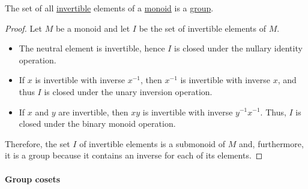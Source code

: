 \begin{proposition}\label{thm:invertible_submonoid_is_group}
  The set of all \hyperref[def:monoid_inverse]{invertible} elements of a \hyperref[def:monoid]{monoid} is a \hyperref[def:group]{group}.
\end{proposition}
\begin{proof}
  Let \( M \) be a monoid and let \( I \) be the set of invertible elements of \( M \).

  \begin{itemize}
    \item The neutral element is invertible, hence \( I \) is closed under the nullary identity operation.
    \item If \( x \) is invertible with inverse \( x^{-1} \), then \( x^{-1} \) is invertible with inverse \( x \), and thus \( I \) is closed under the unary inversion operation.
    \item If \( x \) and \( y \) are invertible, then \( xy \) is invertible with inverse \( y^{-1} x^{-1} \). Thus, \( I \) is closed under the binary monoid operation.
  \end{itemize}

  Therefore, the set \( I \) of invertible elements is a submonoid of \( M \) and, furthermore, it is a group because it contains an inverse for each of its elements.
\end{proof}

\paragraph{Group cosets}

